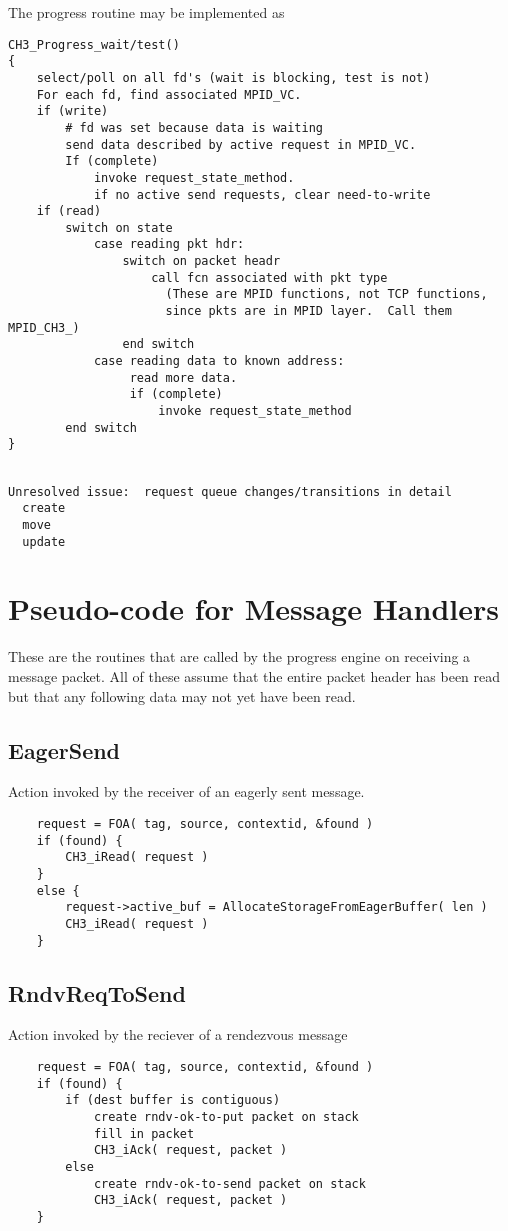 \documentclass{article}
\begin{document}
The progress routine may be implemented as
\begin{verbatim}
CH3_Progress_wait/test()
{
    select/poll on all fd's (wait is blocking, test is not)
    For each fd, find associated MPID_VC.
    if (write)
        # fd was set because data is waiting
        send data described by active request in MPID_VC.  
        If (complete)
            invoke request_state_method.
            if no active send requests, clear need-to-write
    if (read)
        switch on state
            case reading pkt hdr: 
                switch on packet headr
                    call fcn associated with pkt type
                      (These are MPID functions, not TCP functions, 
                      since pkts are in MPID layer.  Call them MPID_CH3_) 
                end switch
            case reading data to known address:
                 read more data.
                 if (complete)
                     invoke request_state_method
        end switch
}
\end{verbatim}

\begin{verbatim}

Unresolved issue:  request queue changes/transitions in detail
  create
  move
  update
\end{verbatim}


\section{Pseudo-code for Message Handlers}
These are the routines that are called by the progress engine on receiving a
message packet.  All of these assume that the entire packet header has been 
read but that any following data may not yet have been read.

\subsection{EagerSend}
Action invoked by the receiver of an eagerly sent message.
\begin{verbatim}
    request = FOA( tag, source, contextid, &found )
    if (found) {
        CH3_iRead( request )
    }
    else {
        request->active_buf = AllocateStorageFromEagerBuffer( len )
        CH3_iRead( request )
    }
\end{verbatim}

\subsection{RndvReqToSend}
Action invoked by the reciever of a rendezvous message
\begin{verbatim}
    request = FOA( tag, source, contextid, &found )
    if (found) {
        if (dest buffer is contiguous)
            create rndv-ok-to-put packet on stack
            fill in packet
            CH3_iAck( request, packet )
        else
            create rndv-ok-to-send packet on stack
            CH3_iAck( request, packet )
    }
\end{verbatim}
\end{document}
